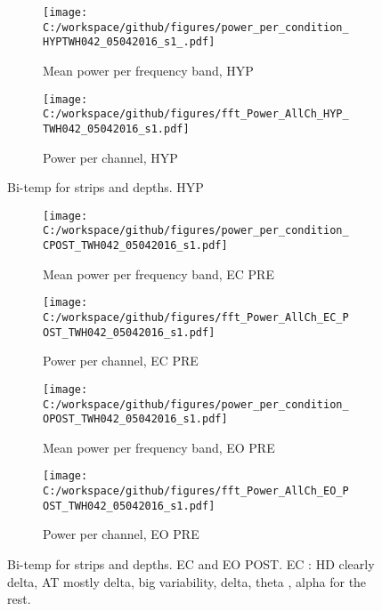 \documentclass[11pt, onecolumn]{article}
\begin{document}
{%
\begin{figure}[t!] %
\begin{subfigure}{0.48\textwidth}
\texttt{[image: C:/workspace/github/figures/power\_per\_condition\_HYPTWH042\_05042016\_s1\_.pdf]}
\caption{Mean power per frequency band, HYP} \label{fig:a}
\end{subfigure}\hspace*{\fill}
\begin{subfigure}{0.48\textwidth}
\texttt{[image: C:/workspace/github/figures/fft\_Power\_AllCh\_HYP\_TWH042\_05042016\_s1.pdf]}
\caption{Power per channel, HYP} \label{fig:b}
\end{subfigure}
\caption{Bi-temp for strips and depths. HYP} \label{fig:42HYP}
\end{figure}



\begin{figure}[t!]
\begin{subfigure}{0.48\textwidth}
\texttt{[image: C:/workspace/github/figures/power\_per\_condition\_CPOST\_TWH042\_05042016\_s1.pdf]}
\caption{Mean power per frequency band, EC PRE} \label{fig:a}
\end{subfigure}\hspace*{\fill}
\begin{subfigure}{0.48\textwidth}
\texttt{[image: C:/workspace/github/figures/fft\_Power\_AllCh\_EC\_POST\_TWH042\_05042016\_s1.pdf]}
\caption{Power per channel, EC PRE} \label{fig:b}
\end{subfigure}

\medskip
\begin{subfigure}{0.48\textwidth}
\texttt{[image: C:/workspace/github/figures/power\_per\_condition\_OPOST\_TWH042\_05042016\_s1.pdf]}
\caption{Mean power per frequency band, EO PRE} \label{fig:a}
\end{subfigure}\hspace*{\fill}
\begin{subfigure}{0.48\textwidth}
\texttt{[image: C:/workspace/github/figures/fft\_Power\_AllCh\_EO\_POST\_TWH042\_05042016\_s1.pdf]}
\caption{Power per channel, EO PRE} \label{fig:b}
\end{subfigure}
\caption{Bi-temp for strips and depths. EC and EO POST.
EC : HD clearly delta, AT mostly delta, big variability, delta, theta , alpha for the rest.
} \label{fig:42POST}
\end{figure}

}
\end{document}
